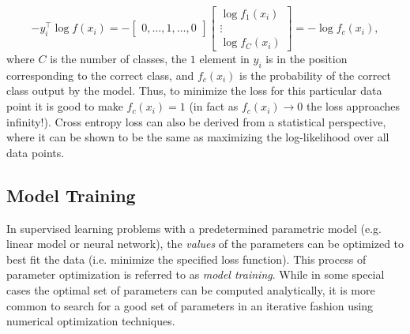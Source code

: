 \begin{enumerate}
\begin{equation*}
-y^\top_i \log f(x_i) = -\begin{bmatrix}
0, \dots, 1, \dots, 0
\end{bmatrix}\begin{bmatrix}
\log f_1(x_i) \\ \vdots \\ \log f_C(x_i)
\end{bmatrix} = -\log f_c(x_i),
\end{equation*}
where $C$ is the number of classes, the $1$ element in $y_i$ is in the position corresponding to the correct class, and $f_c(x_i)$ is the probability of the correct class output by the model. Thus, to minimize the loss for this particular data point it is good to make $f_c(x_i) = 1$ (in fact as $f_c(x_i)\xrightarrow{} 0$ the loss approaches infinity!).
Cross entropy loss can also be derived from a statistical perspective, where it can be shown to be the same as maximizing the log-likelihood over all data points.
\end{enumerate}

\subsection{Model Training}
In supervised learning problems with a predetermined parametric model (e.g. linear model or neural network), the \textit{values} of the parameters can be optimized to best fit the data (i.e. minimize the specified loss function). This process of parameter optimization is referred to as \textit{model training}. While in some special cases the optimal set of parameters can be computed analytically, it is more common to search for a good set of parameters in an iterative fashion using numerical optimization techniques.

